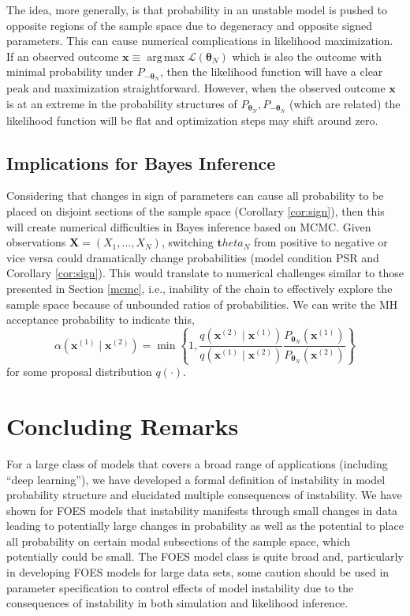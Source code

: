 \documentclass[]{article}
\theoremstyle{definition}
\DeclareMathOperator*{\argmax}{arg\,max}
\begin{document}
The idea, more generally, is that probability in an unstable model is
pushed to opposite regions of the sample space due to degeneracy and
opposite signed parameters. This can cause numerical complications in
likelihood maximization. If an observed outcome
\(\boldsymbol x \equiv \argmax \mathcal{L}(\boldsymbol \theta_N)\) which
is also the outcome with minimal probability under
\(P_{-\boldsymbol \theta_N}\), then the likelihood function will have a
clear peak and maximization straightforward. However, when the observed
outcome \(\boldsymbol x\) is at an extreme in the probability structures
of \(P_{\boldsymbol \theta_N}, P_{-\boldsymbol \theta_N}\) (which are
related) the likelihood function will be flat and optimization steps may
shift around zero.

\subsection{Implications for Bayes
Inference}\label{implications-for-bayes-inference}

Considering that changes in sign of parameters can cause all probability
to be placed on disjoint sections of the sample space (Corollary
\ref{cor:sign}), then this will create numerical difficulties in Bayes
inference based on MCMC. Given observations
\(\boldsymbol X = (X_1,\ldots,X_N)\), switching \(\boldsymbol theta_N\)
from positive to negative or vice versa could dramatically change
probabilities (model condition PSR and Corollary \ref{cor:sign}). This
would translate to numerical challenges similar to those presented in
Section \ref{mcmc}, i.e., inability of the chain to effectively explore
the sample space because of unbounded ratios of probabilities. We can
write the MH acceptance probability to indicate this, \[
\alpha\left(\boldsymbol x^{(1)} \mid \boldsymbol x^{(2)}\right)= \min\left\{1, 
\frac{q(\boldsymbol x^{(2)} \mid \boldsymbol x^{(1)})}{q(\boldsymbol x^{(1)} \mid \boldsymbol x^{(2)})}\frac{P_{\boldsymbol \theta_N} ( \boldsymbol x^{(1)} )}{P_{\boldsymbol \theta_N} (  \boldsymbol x^{(2)} ) } \right\}
\] for some proposal distribution \(q(\cdot)\).

\section{Concluding Remarks}\label{conclusions}

For a large class of models that covers a broad range of applications
(including ``deep learning''), we have developed a formal definition of
instability in model probability structure and elucidated multiple
consequences of instability. We have shown for FOES models that
instability manifests through small changes in data leading to
potentially large changes in probability as well as the potential to
place all probability on certain modal subsections of the sample space,
which potentially could be small. The FOES model class is quite broad
and, particularly in developing FOES models for large data sets, some
caution should be used in parameter specification to control effects of
model instability due to the consequences of instability in both
simulation and likelihood inference.
\end{document}
